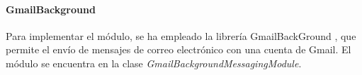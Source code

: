\paragraph*{GmailBackground\\}
Para implementar el módulo, se ha empleado la librería GmailBackGround \cite{gmailbg}, que permite el envío de mensajes de correo electrónico con una cuenta de Gmail. El módulo se encuentra en la clase \textit{GmailBackgroundMessagingModule}.
\newpage









